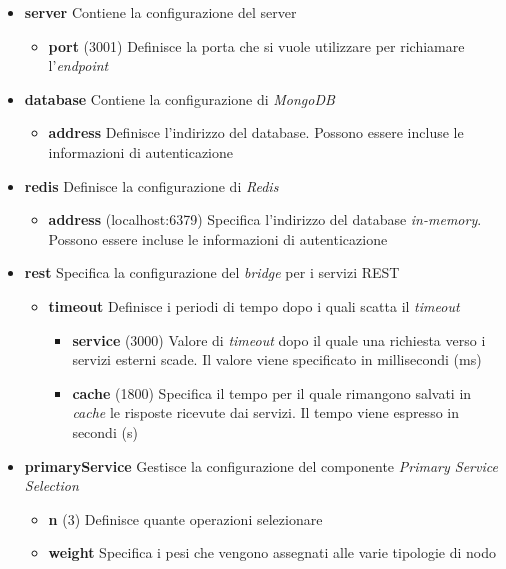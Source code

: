 \begin{itemize}
	\item \textbf{server}
	Contiene la configurazione del server
	\begin{itemize}
		\item \textbf{port}
		(3001) Definisce la porta che si vuole utilizzare per richiamare l'\emph{endpoint}
	\end{itemize}
	\item \textbf{database}
	Contiene la configurazione di \emph{MongoDB}
	\begin{itemize}
		\item \textbf{address}
		Definisce l'indirizzo del database. Possono essere incluse le informazioni di autenticazione
	\end{itemize}
	\item \textbf{redis}
	Definisce la configurazione di \emph{Redis}
	\begin{itemize}
		\item \textbf{address}
		(localhost:6379) Specifica l'indirizzo del database \emph{in-memory}. Possono essere incluse le informazioni di autenticazione
	\end{itemize}
	\item \textbf{rest}
	Specifica la configurazione del \emph{bridge} per i servizi REST
	\begin{itemize}
		\item \textbf{timeout}
		Definisce i periodi di tempo dopo i quali scatta il \emph{timeout}
		\begin{itemize}
			\item \textbf{service}
			(3000) Valore di \emph{timeout} dopo il quale una richiesta verso i servizi esterni scade. Il valore viene specificato in millisecondi (ms)
			\item \textbf{cache}
			(1800) Specifica il tempo per il quale rimangono salvati in \emph{cache} le risposte ricevute dai servizi. Il tempo viene espresso in secondi (s)
		\end{itemize}
	\end{itemize}
	\item \textbf{primaryService}
	Gestisce la configurazione del componente \emph{Primary Service Selection}
	\begin{itemize}
		\item \textbf{n}
		(3) Definisce quante operazioni selezionare
		\item \textbf{weight}
		Specifica i pesi che vengono assegnati alle varie tipologie di nodo
		\begin{itemize}

\end{itemize}
\end{itemize}
\end{itemize}
